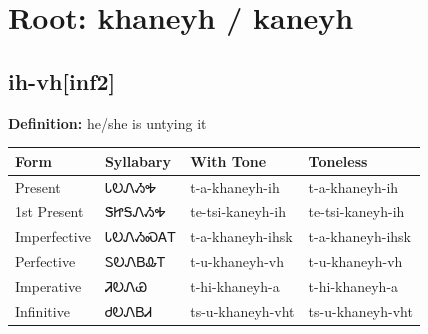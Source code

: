 \documentclass{article}%
\begin{document}
%
\normalsize%
\section*{Root: khaneyh / kaneyh}%
\subsection*{ih-vh[inf2]}%
\textbf{Definition: }%
he/she is untying it%
\\[0.5em]%
\begin{tabular}{|l|l|l|l|}%
\hline%
\textbf{Form}&\textbf{Syllabary}&\textbf{With Tone}&\textbf{Toneless}\\%
\hline%
Present&ᏓᎧᏁᏱᎭ&t{-}a{-}khaneyh{-}ih&t{-}a{-}khaneyh{-}ih\\%
1st Present&ᏕᏥᎦᏁᏱᎭ&te{-}tsi{-}kaneyh{-}ih&te{-}tsi{-}kaneyh{-}ih\\%
Imperfective&ᏓᎧᏁᏱᏍᎪᎢ&t{-}a{-}khaneyh{-}ihsk&t{-}a{-}khaneyh{-}ihsk\\%
Perfective&ᏚᎧᏁᏴᎲᎢ&t{-}u{-}khaneyh{-}vh&t{-}u{-}khaneyh{-}vh\\%
Imperative&ᏘᎧᏁᏯ&t{-}hi{-}khaneyh{-}a&t{-}hi{-}khaneyh{-}a\\%
Infinitive&ᏧᎧᏁᏴᏗ&ts{-}u{-}khaneyh{-}vht&ts{-}u{-}khaneyh{-}vht\\%
\hline%
\end{tabular}%
\\[1em]%
\end{document}
